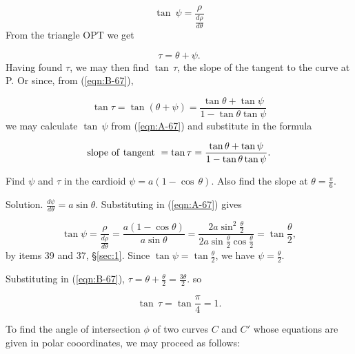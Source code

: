 \begin{equation}
\tan\ \psi = \frac{\rho}{\frac{d\rho}{d\theta}}
\label{eqn:A-67}
\end{equation}	
From the triangle OPT we get

\begin{equation}
\tau = \theta + \psi.
\label{eqn:B-67}
\end{equation}	
Having found $\tau$, we may then find $\tan\,\tau$, the slope of the tangent 
to the curve at P. Or since, from (\ref{eqn:B-67}),

\[
    \tan \tau = \tan (\theta + \psi) = \frac{\tan \theta + \tan \psi}{1 - \tan \theta \tan \psi}
\]
we may calculate $\tan\, \psi$ from (\ref{eqn:A-67}) and substitute in the formula

\begin{equation}
{\rm slope\ of\ tangent}\ = \tan \tau = \frac{\tan \theta + \tan \psi}{1 - \tan \theta \tan \psi}.
\label{eqn:C-67}
\end{equation}	

\begin{example}
{\rm
Find $\psi$ and $\tau$ in the cardioid 
$\psi = a(1 -\cos\,\theta)$. Also find the slope at $\theta = \frac{\pi}{6}$.

Solution. $\frac{d\psi}{d\theta} = a \sin \theta$. 
Substituting in (\ref{eqn:A-67}) gives

\[
 \tan \psi 
= \frac{\rho}{\frac{d\rho}{d\theta}} 
= \frac{a(1 - \cos \theta)}{a \sin \theta} 
= \frac{2 a \sin^2 \frac{\theta}{2}}{2a \sin \frac{\theta}{2} \cos \frac{\theta}{2}} 
= \tan \frac{\theta}{2},
\]
by items 39 and 37, \S \ref{sec:1}. %
Since $\tan \psi = \tan \frac{\theta}{2}$, we have
$\psi = \frac{\theta}{2}$.

Substituting in (\ref{eqn:B-67}), 
$\tau = \theta + \frac{\theta}{2} = \frac{3\theta}{2}$.
so

\[
\tan\, \tau = \tan \frac{\pi}{4} = 1. 
\]
}
\end{example}


To find the angle of intersection $\phi$ of two curves $C$ and $C'$ whose 
equations are given in polar cooordinates, we may proceed as follows:

